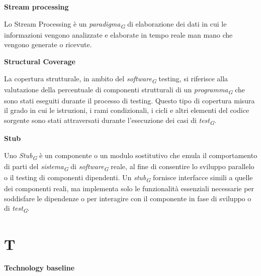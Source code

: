 \documentclass{article}
\begin{document}
\vspace{0.4cm}

\textbf{Stream processing}

\vspace{0.1cm}

Lo Stream Processing è un \textit{paradigma}\textsubscript{\textit{G}} di elaborazione dei dati in cui le informazioni vengono analizzate e elaborate in tempo reale man mano che vengono generate o ricevute.

\vspace{0.4cm}

\textbf{Structural Coverage}

\vspace{0.1cm}

La copertura strutturale, in ambito del \textit{software}\textsubscript{\textit{G}} testing, si riferisce alla valutazione della percentuale di componenti strutturali di un \textit{programma}\textsubscript{\textit{G}} che sono stati eseguiti durante il processo di testing. Questo tipo di copertura misura il grado in cui le istruzioni, i rami condizionali, i cicli e altri elementi del codice sorgente sono stati attraversati durante l'esecuzione dei casi di \textit{test}\textsubscript{\textit{G}}. 

\vspace{0.4cm}

\textbf{Stub}

\vspace{0.1cm}

Uno \textit{Stub}\textsubscript{\textit{G}} è un componente o un modulo sostitutivo che emula il comportamento di parti del \textit{sistema}\textsubscript{\textit{G}} di \textit{software}\textsubscript{\textit{G}} reale, al fine di consentire lo sviluppo parallelo o il testing di componenti dipendenti. Un \textit{stub}\textsubscript{\textit{G}} fornisce interfacce simili a quelle dei componenti reali, ma implementa solo le funzionalità essenziali necessarie per soddisfare le dipendenze o per interagire con il componente in fase di sviluppo o di \textit{test}\textsubscript{\textit{G}}. 

\pagebreak
\section*{T}
{}

\vspace{0.4cm}

\textbf{Technology baseline}
\end{document}
